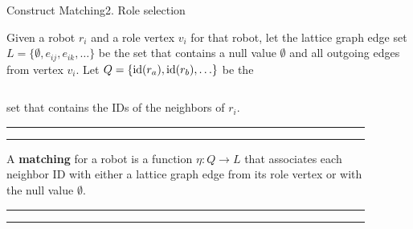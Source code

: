 \documentclass[10pt]{beamer}
\newcommand{\id}{{\rm id}}
\begin{document}
\begin{frame}{Construct Matching}{2. Role selection}
 \begin{block}{}
  Given a robot $r_i$ and a role vertex $v_i$ for that
  robot, let the lattice graph edge set $L=\{\emptyset,e_{ij}, e_{ik},
  \ldots\}$ be the set that contains a null value $\emptyset$ and all
  outgoing edges from vertex $v_i$. Let $Q=\{\id(r_a), \id(r_b),
  \ldots \}$ be the 
  \begin{columns}[T] %
    \hspace{4mm}
    \begin{column}{.45\textwidth}
      set that contains the IDs of the neighbors of $r_i$.  
      \vspace{2mm}
      \hrule
      \hrule
     \begin{bclogo}[noborder=true, logo=\bccrayon]{} 
        A \textbf{matching} for a robot is a function $\eta : Q \rightarrow L$ that
        associates each neighbor ID with either a lattice graph edge
        from its role vertex or with the null value $\emptyset$.
      \end{bclogo}
      \hrule
      \hrule
    \end{column}%
    \begin{column}{.55\textwidth}
      \begin{figure}
        \centering
      \end{figure}
    \end{column}%
  \end{columns}
  \end{block}
\end{frame}
\end{document}

